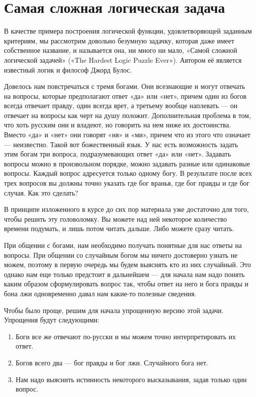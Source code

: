 \section{Самая сложная логическая задача}

В качестве примера построения логической функции, удовлетворяющей заданным критериям, мы рассмотрим довольно безумную задачку, которая даже имеет собственное название, и называется она, ни много ни мало, «Самой сложной логической задачей» («The Hardest Logic Puzzle Ever»). Автором её является известный логик и философ Джорд Булос.

\begin{problem}Довелось нам повстречаться с тремя богами. Они всезнающие и могут отвечать на вопросы, которые предполагают ответ «да» или «нет», причем один из богов всегда отвечает правду, один всегда врет, а третьему вообще наплевать — он отвечает на вопросы как черт на душу положит. Дополнительная проблема в том, что хоть русским они и владеют, но говорить на нем ниже их достоинства. Вместо «да» и «нет» они говорят «ня» и «ми», причем что из этого что означает — неизвестно. Такой вот божественный язык. У нас есть возможность задать этим богам три вопроса, подразумевающих ответ «да» или «нет». Задавать вопросы можно в произвольном порядке, можно задавать разные или одинаковые вопросы. Каждый вопрос адресуется только одному богу. В результате после всех трех вопросов вы должны точно указать где бог вранья, где бог правды и где бог случая. Как это сделать?\end{problem}

В принципе изложенного в курсе до сих пор материала уже достаточно для того, чтобы решить эту головоломку. Вы можете над ней некоторое количество времени подумать, и лишь потом читать дальше. Либо можете сразу читать.

При общении с богами, нам необходимо получать понятные для нас ответы на вопросы. При общении со случайным богом мы ничего достоверно узнать не можем, поэтому в первую очередь мы будем выяснять кто из них случайный. Это однако нам еще только предстоит в дальнейшем — для начала нам надо понять каким образом сформулировать вопрос так, чтобы ответ на него и бога правды и бона лжи одновременно давал нам какие-то полезные сведения.

Чтобы было проще, решим для начала упрощенную версию этой задачи. Упрощения будут следующими:

\begin{enumerate}
\item Боги все же отвечают по-русски и мы можем точно интерпретировать их ответ.
\item Богов всего два — бог правды и бог лжи. Случайного бога нет.
\item Нам надо выяснить истинность некоторого высказывания, задав только один вопрос.
\end{enumerate}

